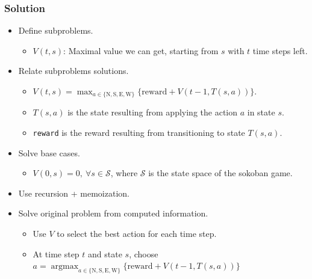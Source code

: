 \documentclass{beamer}
\DeclareMathOperator*{\argmax}{argmax}
\begin{document}
\ifanswers

\begin{frame}%
\frametitle{Solution}

\scriptsize
{}
\begin{itemize}

\item Define subproblems.
\begin{itemize}
\scriptsize
\item<2-> $V(t, s)$: Maximal value we can get, starting from $s$ with $t$ time steps left.
\end{itemize}

\vspace{0.1cm}

\item<3-> Relate subproblems solutions.
\begin{itemize}
\scriptsize
\item<4-> $V(t, s) = \max_{a \in \{\textrm{N}, \textrm{S}, \textrm{E}, \textrm{W}\}} \{\textrm{reward} + V(t - 1, T(s, a))\}$.
\item<5-> $T(s, a)$ is the state resulting from applying the action $a$ in state $s$.
\item<5-> \texttt{reward} is the reward resulting from transitioning to state $T(s, a)$.
\end{itemize}

\vspace{0.1cm}

\item<6-> Solve base cases.
\begin{itemize}
\scriptsize
\item<7-> $V(0, s) = 0,\ \forall s\in \mathcal{S}$, where $\mathcal{S}$ is the state space of the sokoban game.
\end{itemize}

\vspace{0.1cm}

\item<8-> Use recursion + memoization.

\vspace{0.1cm}

\item<9-> Solve original problem from computed information.
\begin{itemize}
\scriptsize
\item<10-> Use $V$ to select the best action for each time step.
\item<10-> At time step $t$ and state $s$, choose $a = \argmax_{a \in \{\textrm{N}, \textrm{S}, \textrm{E}, \textrm{W}\}}\{\textrm{reward} + V(t - 1, T(s, a))\}$
\end{itemize}


\end{itemize}
\end{frame}
\end{document}
